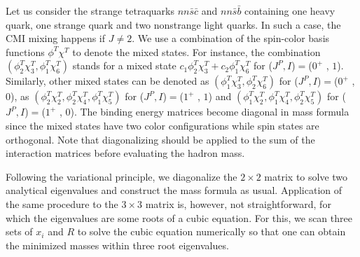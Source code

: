 \documentclass[prd,twocolumn,floatfix,nofootinbib]{revtex4}
\begin{document}
Let us consider the strange tetraquarks $nn\bar{s}\bar{c}$ and $nn\bar{s}%
\bar{b}$ containing one heavy quark, one strange quark and two nonstrange
light quarks. In such a case, the CMI mixing happens if $J\neq 2$. We use a
combination of the spin-color basis functions $\phi ^{T}\chi ^{T}$ to denote
the mixed states. For instance, the combination $(\phi _{2}^{T}\chi
_{3}^{T},\phi _{1}^{T}\chi _{6}^{T})$ stands for a mixed state $c_{1}\phi
_{2}^{T}\chi _{3}^{T}+c_{2}\phi _{1}^{T}\chi _{6}^{T}$ for ($J^{P},I$)$=$($%
0^{+}$ , $1$). Similarly, other mixed states can be denoted as $(\phi
_{1}^{T}\chi _{3}^{T},\phi _{2}^{T}\chi _{6}^{T})$ for ($J^{P},I$)$=$($0^{+}$
, $0$), as $(\phi _{2}^{T}\chi _{2}^{T},\phi _{2}^{T}\chi _{4}^{T},\phi
_{1}^{T}\chi _{5}^{T})$ for ($J^{P},I$)$=$($1^{+}$ , $1$) and $(\phi
_{1}^{T}\chi _{2}^{T},\phi _{1}^{T}\chi _{4}^{T},\phi _{2}^{T}\chi _{5}^{T})$
for ($J^{P},I$)$=$($1^{+}$ , $0$). The binding energy matrices become
diagonal in mass formula since the mixed states have two color
configurations while spin states are orthogonal. Note that diagonalizing
should be applied to the sum of the interaction matrices before evaluating
the hadron mass.

Following the variational principle, we diagonalize the $2\times 2$ matrix
to solve two analytical eigenvalues and construct the mass formula as usual.
Application of the same procedure to the $3\times 3$ matrix is, however, not
straightforward, for which the eigenvalues are some roots of a cubic
equation. For this, we scan three sets of $x_{i}$ and $R$ to solve the cubic
equation numerically so that one can obtain the minimized masses within
three root eigenvalues.
\end{document}
